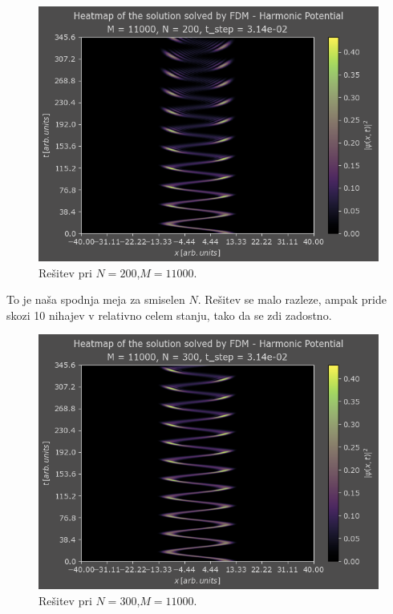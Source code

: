 \documentclass[a4paper]{article}
\begin{document}
\begin{figure}[H]
    \centering
    \includegraphics[width=\textwidth]{./images/case1_N200.png}
    \caption{Rešitev pri $N=200$,$M=11000$.}
\end{figure}

To je naša spodnja meja za smiselen $N$. Rešitev se malo razleze, ampak pride 
skozi 10 nihajev v relativno celem stanju, tako da se zdi zadostno.

\begin{figure}[H]
    \centering
    \includegraphics[width=\textwidth]{./images/case1_N300.png}
    \caption{Rešitev pri $N=300$,$M=11000$.}
\end{figure}
\end{document}

